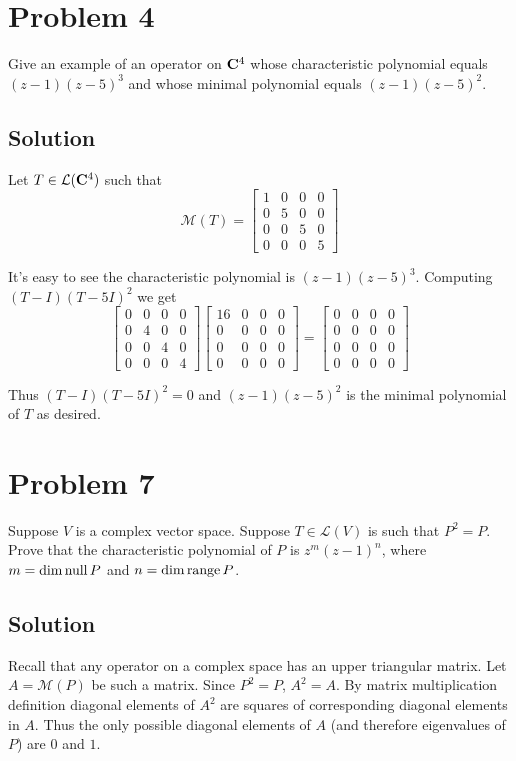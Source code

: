 \documentclass{article}
\begin{document}
\section*{Problem 4}
Give an example of an operator on $\mathbf{C}^4$ whose characteristic polynomial equals $(z-1)(z-5)^3$ and whose minimal polynomial equals $(z-1)(z-5)^2$.

\subsection*{Solution}
Let $T\in\mathcal{L}(\mathbf{C}^4)$ such that
\[\mathcal{M}(T)=\begin{bmatrix}
    1 & 0 & 0 & 0\\
    0 & 5 & 0 & 0\\
    0 & 0 & 5 & 0\\
    0 & 0 & 0 & 5
\end{bmatrix}\]

It's easy to see the characteristic polynomial is $(z-1)(z-5)^3$. Computing $(T-I)(T-5I)^2$ we get
\[\begin{bmatrix}
    0 & 0 & 0 & 0\\
    0 & 4 & 0 & 0\\
    0 & 0 & 4 & 0\\
    0 & 0 & 0 & 4
\end{bmatrix}\begin{bmatrix}
    16 & 0 & 0 & 0\\
    0 & 0 & 0 & 0\\
    0 & 0 & 0 & 0\\
    0 & 0 & 0 & 0
\end{bmatrix}=\begin{bmatrix}
    0 & 0 & 0 & 0\\
    0 & 0 & 0 & 0\\
    0 & 0 & 0 & 0\\
    0 & 0 & 0 & 0
\end{bmatrix}\]

Thus $(T-I)(T-5I)^2=0$ and $(z-1)(z-5)^2$ is the minimal polynomial of $T$ as desired.

\section*{Problem 7}
Suppose $V$ is a complex vector space. Suppose $T\in\mathcal{L}(V)$ is such that $P^2=P$. Prove that the characteristic polynomial of $P$ is $z^m(z-1)^n$, where $m=\dim\text{null}\, P$ and $n=\dim\text{range}\, P$.

\subsection*{Solution}
Recall that any operator on a complex space has an upper triangular matrix. Let $A=\mathcal{M}(P)$ be such a matrix. Since $P^2=P$, $A^2=A$. By matrix multiplication definition diagonal elements of $A^2$ are squares of corresponding diagonal elements in $A$. Thus the only possible diagonal elements of $A$ (and therefore eigenvalues of $P$) are $0$ and $1$.
\end{document}
